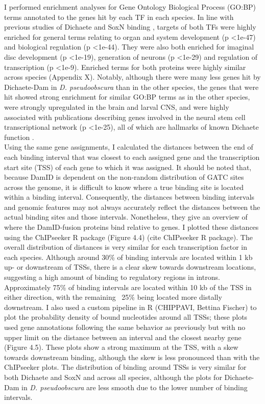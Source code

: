 I performed enrichment analyses for Gene Ontology Biological Process (GO:BP) terms annotated to the genes hit by each TF in each species. In line with previous studies of Dichaete and SoxN binding \citep{aleksic_role_2013,ferrero_soxneuro_2014}, targets of both TFs were highly enriched for general terms relating to organ and system development (p \textless 1e-47) and biological regulation (p \textless 1e-44). They were also both enriched for imaginal disc development (p \textless 1e-19), generation of neurons (p \textless 1e-29) and regulation of transcription (p \textless 1e-9). Enriched terms for both proteins were highly similar across species (Appendix X). Notably, although there were many less genes hit by Dichaete-Dam in \emph{D. pseudoobscura} than in the other species, the genes that were hit showed strong enrichment for similar GO:BP terms as in the other species, were strongly upregulated in the brain and larval CNS, and were highly associated with publications describing genes involved in the neural stem cell transcriptional network (p \textless 1e-25), all of which are hallmarks of known Dichaete function \citep{aleksic_role_2013,shen_identifying_2013,soriano_drosophila_1998}.\\ 

Using the same gene assignments, I calculated the distances between the end of each binding interval that was closest to each assigned gene and the transcription start site (TSS) of each gene to which it was assigned. It should be noted that, because DamID is dependent on the non-random distribution of GATC sites across the genome, it is difficult to know where a true binding site is located within a binding interval. Consequently, the distances between binding intervals and genomic features may not always accurately reflect the distances between the actual binding sites and those intervals. Nonetheless, they give an overview of where the DamID-fusion proteins bind relative to genes. I plotted these distances using the ChIPseeker R package (Figure 4.4) (cite ChIPseeker R package). The overall distribution of distances is very similar for each transcription factor in each species. Although around 30\% of binding intervals are located within 1 kb up- or downstream of TSSs, there is a clear skew towards downstream locations, suggesting a high amount of binding to regulatory regions in introns. Approximately 75\% of binding intervals are located within 10 kb of the TSS in either direction, with the remaining ~25\% being located more distally downstream. I also used a custom pipeline in R (CHIPPAVI, Bettina Fischer) to plot the probability density of bound nucleotides around all TSSs; these plots used gene annotations following the same behavior as previously but with no upper limit on the distance between an interval and the closest nearby gene (Figure 4.5). These plots show a strong maximum at the TSS, with a skew towards downstream binding, although the skew is less pronounced than with the ChIPseeker plots. The distribution of binding around TSSs is very similar for both Dichaete and SoxN and across all species, although the plots for Dichaete-Dam in \emph{D. pseudoobscura} are less smooth due to the lower number of binding intervals.\\

